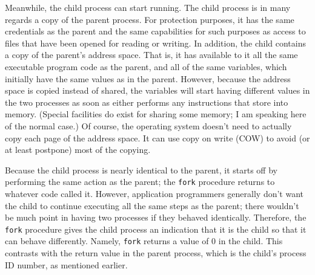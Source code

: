 Meanwhile, the child process can start running.  The child process is
in many regards a copy of the parent process.  For protection
purposes, it has the same credentials as the parent and the same
capabilities for such purposes as access to files that have been opened
for reading or writing.
In addition, the child contains a copy of the parent's address space.  That
is, it has available to it all the same executable program code as the
parent, and all of the same variables, which initially have the same
values as in the parent.  However, because the address space is copied
instead of shared, the variables will start having different values in
the two processes as soon as either performs any instructions that
store into memory.
(Special facilities do exist for sharing some memory; I am speaking
here of the normal case.)  Of course, the operating system doesn't
need to actually copy each page of the address space.  It can use
copy on write (COW) to avoid (or at
least postpone) most of the copying.

Because the child process is nearly identical to the parent, it starts
off by performing the same action as the parent; the
\verb|fork| procedure returns to whatever
code called it.  However, application programmers generally don't want
the child to continue executing all the same steps as the parent;
there wouldn't be much point in having two processes if they behaved
identically.  Therefore, the \verb|fork| procedure gives the child
process an indication that it is the child so that it can behave
differently.  Namely, \verb|fork| returns a value of 0 in the child.
This contrasts with the return value in the parent process, which is
the child's process ID number, as mentioned earlier.

